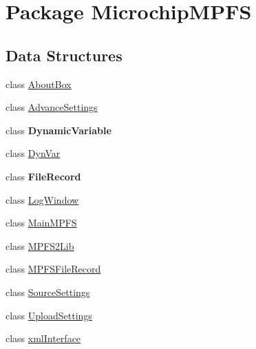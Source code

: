\hypertarget{namespace_microchip_m_p_f_s}{}\section{Package Microchip\+M\+P\+F\+S}
\label{namespace_microchip_m_p_f_s}
\subsection*{Data Structures}
\begin{DoxyCompactItemize}
\item 
class \hyperlink{class_microchip_m_p_f_s_1_1_about_box}{About\+Box}
\item 
class \hyperlink{class_microchip_m_p_f_s_1_1_advance_settings}{Advance\+Settings}
\item 
class {\bfseries Dynamic\+Variable}
\item 
class \hyperlink{class_microchip_m_p_f_s_1_1_dyn_var}{Dyn\+Var}
\item 
class {\bfseries File\+Record}
\item 
class \hyperlink{class_microchip_m_p_f_s_1_1_log_window}{Log\+Window}
\item 
class \hyperlink{class_microchip_m_p_f_s_1_1_main_m_p_f_s}{Main\+M\+P\+F\+S}
\item 
class \hyperlink{class_microchip_m_p_f_s_1_1_m_p_f_s2_lib}{M\+P\+F\+S2\+Lib}
\item 
class \hyperlink{class_microchip_m_p_f_s_1_1_m_p_f_s_file_record}{M\+P\+F\+S\+File\+Record}
\item 
class \hyperlink{class_microchip_m_p_f_s_1_1_source_settings}{Source\+Settings}
\item 
class \hyperlink{class_microchip_m_p_f_s_1_1_upload_settings}{Upload\+Settings}
\item 
class \hyperlink{class_microchip_m_p_f_s_1_1xml_interface}{xml\+Interface}
\end{DoxyCompactItemize}
